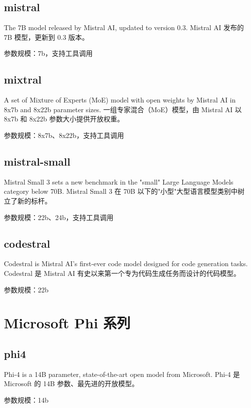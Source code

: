 \documentclass[12pt,UTF8]{ctexbook}
\begin{document}
\subsection{mistral}

The 7B model released by Mistral AI, updated to version 0.3.
Mistral AI 发布的 7B 模型，更新到 0.3 版本。

参数规模：7b，支持工具调用

\subsection{mixtral}

A set of Mixture of Experts (MoE) model with open weights by Mistral AI in 8x7b and 8x22b parameter sizes.
一组专家混合（MoE）模型，由 Mistral AI 以 8x7b 和 8x22b 参数大小提供开放权重。

参数规模：8x7b、8x22b，支持工具调用

\subsection{mistral-small}

Mistral Small 3 sets a new benchmark in the "small" Large Language Models category below 70B.
Mistral Small 3 在 70B 以下的"小型"大型语言模型类别中树立了新的标杆。

参数规模：22b、24b，支持工具调用

\subsection{codestral}

Codestral is Mistral AI's first-ever code model designed for code generation tasks.
Codestral 是 Mistral AI 有史以来第一个专为代码生成任务而设计的代码模型。

参数规模：22b

\section{Microsoft Phi 系列}

\subsection{phi4}

Phi-4 is a 14B parameter, state-of-the-art open model from Microsoft.
Phi-4 是 Microsoft 的 14B 参数、最先进的开放模型。

参数规模：14b
\end{document}
